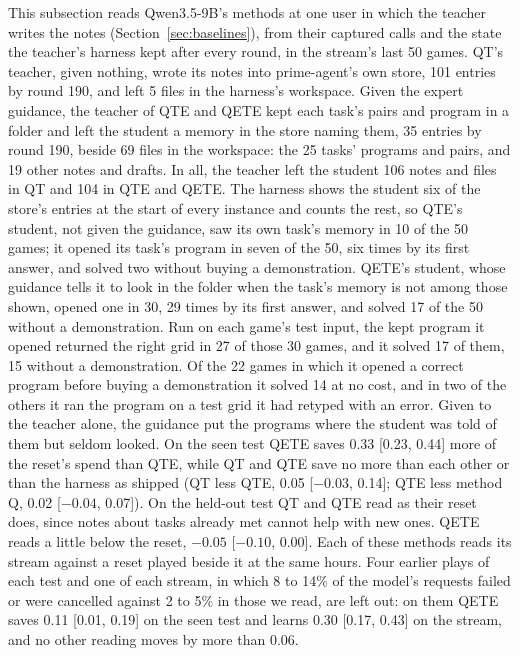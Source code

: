 This subsection reads Qwen3.5-9B's methods at one user in which the teacher writes the notes (Section~\ref{sec:baselines}), from their captured calls and the state the teacher's harness kept after every round, in the stream's last 50 games. QT's teacher, given nothing, wrote its notes into prime-agent's own store, 101 entries by round 190, and left 5 files in the harness's workspace. Given the expert guidance, the teacher of QTE and QETE kept each task's pairs and program in a folder and left the student a memory in the store naming them, 35 entries by round 190, beside 69 files in the workspace: the 25 tasks' programs and pairs, and 19 other notes and drafts. In all, the teacher left the student 106 notes and files in QT and 104 in QTE and QETE. The harness shows the student six of the store's entries at the start of every instance and counts the rest, so QTE's student, not given the guidance, saw its own task's memory in 10 of the 50 games; it opened its task's program in seven of the 50, six times by its first answer, and solved two without buying a demonstration. QETE's student, whose guidance tells it to look in the folder when the task's memory is not among those shown, opened one in 30, 29 times by its first answer, and solved 17 of the 50 without a demonstration. Run on each game's test input, the kept program it opened returned the right grid in 27 of those 30 games, and it solved 17 of them, 15 without a demonstration. Of the 22 games in which it opened a correct program before buying a demonstration it solved 14 at no cost, and in two of the others it ran the program on a test grid it had retyped with an error. Given to the teacher alone, the guidance put the programs where the student was told of them but seldom looked. On the seen test QETE saves 0.33 [0.23, 0.44] more of the reset's spend than QTE, while QT and QTE save no more than each other or than the harness as shipped (QT less QTE, 0.05 [$-0.03$, 0.14]; QTE less method Q, 0.02 [$-0.04$, 0.07]). On the held-out test QT and QTE read as their reset does, since notes about tasks already met cannot help with new ones. QETE reads a little below the reset, $-0.05$ [$-0.10$, 0.00]. Each of these methods reads its stream against a reset played beside it at the same hours. Four earlier plays of each test and one of each stream, in which 8 to 14\% of the model's requests failed or were cancelled against 2 to 5\% in those we read, are left out: on them QETE saves 0.11 [0.01, 0.19] on the seen test and learns 0.30 [0.17, 0.43] on the stream, and no other reading moves by more than 0.06.

